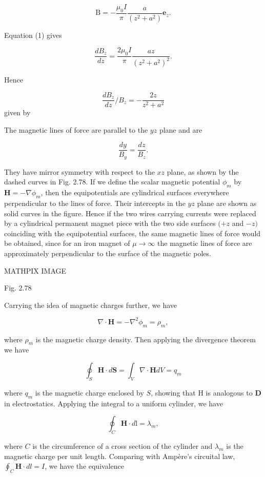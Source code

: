 \documentclass[10pt]{article}
\begin{document}
$$
\mathrm{B}=-\frac{\mu_{0} I}{\pi} \frac{a}{\left(z^{2}+a^{2}\right)} \mathbf{e}_{z} .
$$

 Equation (1) gives

$$
\frac{d B_{z}}{d z}=\frac{2 \mu_{0} I}{\pi} \frac{a z}{\left(z^{2}+a^{2}\right)^{2}} .
$$

Hence

$$
\frac{d B_{z}}{d z} / B_{z}=-\frac{2 z}{z^{2}+a^{2}}
$$
given by

 The magnetic lines of force are parallel to the $y z$ plane and are

$$
\frac{d y}{B_{y}}=\frac{d z}{B_{z}} .
$$

They have mirror symmetry with respect to the $x z$ plane, as shown by the dashed curves in Fig. 2.78. If we define the scalar magnetic potential $\phi_{m}$ by $\mathbf{H}=-\nabla \phi_{m}$, then the equipotentials are cylindrical surfaces everywhere perpendicular to the lines of force. Their intercepts in the $y z$ plane are shown as solid curves in the figure. Hence if the two wires carrying currents were replaced by a cylindrical permanent magnet piece with the two side surfaces $(+z$ and $-z)$ coinciding with the equipotential surfaces, the same magnetic lines of force would be obtained, since for an iron magnet of $\mu \rightarrow \infty$ the magnetic lines of force are approximately perpendicular to the surface of the magnetic poles.

MATHPIX IMAGE

Fig. $2.78$

Carrying the idea of magnetic charges further, we have

$$
\nabla \cdot \mathbf{H}=-\nabla^{2} \phi_{m}=\rho_{m},
$$

where $\rho_{m}$ is the magnetic charge density. Then applying the divergence theorem we have

$$
\oint_{S} \mathbf{H} \cdot d \mathbf{S}=\int_{V} \nabla \cdot \mathbf{H} d V=q_{m}
$$

where $q_{m}$ is the magnetic charge enclosed by $S$, showing that $\mathrm{H}$ is analogous to $\mathbf{D}$ in electrostatics. Applying the integral to a uniform cylinder, we have

$$
\oint_{C} \mathbf{H} \cdot d \mathrm{l}=\lambda_{m},
$$

where $C$ is the circumference of a cross section of the cylinder and $\lambda_{m}$ is the magnetic charge per unit length. Comparing with Ampère's circuital law, $\oint_{C} \mathbf{H} \cdot d l=I$, we have the equivalence
\end{document}
